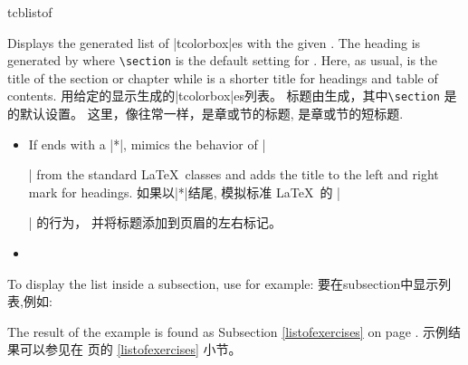 \begin{docCommand}[doc updated=2021-05-20]{tcblistof}{}
\begin{stripedbox}
Displays the generated list of |tcolorbox|es with the given .
The heading is generated by  where \texttt{\textbackslash section}
is the default setting for .
Here, as usual,  is the title of the section or chapter
while  is a shorter title for headings and table of contents.
\tcblower
用给定的显示生成的|tcolorbox|es列表。%
标题由生成，其中\texttt{\textbackslash section} 是的默认设置。%
这里，像往常一样，是章或节的标题, 是章或节的短标题.
\end{stripedbox}

\begin{itemize}
\item 
\begin{stripedbox}
If  ends with a |*|,  mimics the behavior of
|\listoffigures| from the standard \LaTeX\ classes and adds the title
to the left and right mark for headings.
\tcblower
如果以|*|结尾,  模拟标准 \LaTeX\ 的 |\listoffigures| 的行为，%
并将标题添加到页眉的左右标记。
\end{stripedbox}

\item 
{}
\end{itemize}

\medskip
\begin{stripedbox}
To display the list inside a subsection, use for example:
\tcblower
要在subsection中显示列表,例如:
\end{stripedbox}
\begin{dispListing}
\end{dispListing}
\begin{stripedbox}
The result of the example is found as Subsection \ref{listofexercises} on
page \pageref{listofexercises}.
\tcblower
示例结果可以参见在 \pageref{listofexercises} 页的 \ref{listofexercises} 小节。
\end{stripedbox}



\end{docCommand}
